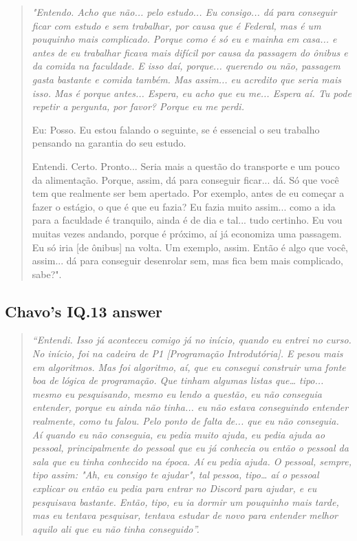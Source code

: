 \begin{quote}
    \itshape
    "Entendo. Acho que não... pelo estudo... Eu consigo... dá para conseguir ficar com estudo e sem trabalhar, por causa que é Federal, mas é um pouquinho mais complicado. Porque como é só eu e mainha em casa... e antes de eu trabalhar ficava mais difícil por causa da passagem do ônibus e da comida na faculdade. E isso daí, porque... querendo ou não, passagem gasta bastante e comida também. Mas assim... eu acredito que seria mais isso. Mas é porque antes... Espera, eu acho que eu me... Espera aí. Tu pode repetir a pergunta, por favor? Porque eu me perdi. 

    \colorbox{black!15}{Eu: Posso. Eu estou falando o seguinte, se é essencial o seu trabalho pensando na} 
    \colorbox{black!15}{garantia do seu estudo.}

    Entendi. Certo. Pronto... Seria mais a questão do transporte e um pouco da alimentação. Porque, assim, dá para conseguir ficar... dá. Só que você tem que realmente ser bem apertado. Por exemplo, antes de eu começar a fazer o estágio, o que é que eu fazia? Eu fazia muito assim... como a ida para a faculdade é tranquilo, ainda é de dia e tal... tudo certinho. Eu vou muitas vezes andando, porque é próximo, aí já economiza uma passagem. Eu só iria [de ônibus] na volta. Um exemplo, assim. Então é algo que você, assim... dá para conseguir desenrolar sem, mas fica bem mais complicado, sabe?".
\end{quote}
\subsection{Chavo’s IQ.13 answer}
\label{interview-exc-ss:chavo-iq13}

\begin{quote}
    \itshape
    “Entendi. Isso já aconteceu comigo já no início, quando eu entrei no curso. No início, foi na cadeira de P1 [Programação Introdutória]. E pesou mais em algoritmos. Mas foi algoritmo, aí, que eu consegui construir uma fonte boa de lógica de programação. Que tinham algumas listas que… tipo... mesmo eu pesquisando, mesmo eu lendo a questão, eu não conseguia entender, porque eu ainda não tinha... eu não estava conseguindo entender realmente, como tu falou. Pelo ponto de falta de... que eu não conseguia. Aí quando eu não conseguia, eu pedia muito ajuda, eu pedia ajuda ao pessoal, principalmente do pessoal que eu já conhecia ou então o pessoal da sala que eu tinha conhecido na época. Aí eu pedia ajuda. O pessoal, sempre, tipo assim: "Ah, eu consigo te ajudar", tal pessoa, tipo… aí o pessoal explicar ou então eu pedia para entrar no Discord para ajudar, e eu pesquisava bastante. Então, tipo, eu ia dormir um pouquinho mais tarde, mas eu tentava pesquisar, tentava estudar de novo para entender melhor aquilo ali que eu não tinha conseguido”. 
\end{quote}


